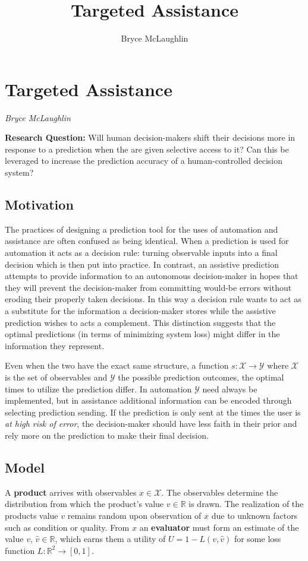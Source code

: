 \documentclass[10pt]{article}
\title{Targeted Assistance}
\author{Bryce McLaughlin}
\newcommand{\X}{\mathcal{X}}
\newcommand{\Y}{\mathcal{Y}}
\begin{document}
\section*{Targeted Assistance}

\textit{Bryce McLaughlin}

\medskip

\textbf{Research Question:} Will human decision-makers shift their decisions more in response to a prediction when the are given selective access to it? Can this be leveraged to increase the prediction accuracy of a human-controlled decision system?

\subsection*{Motivation}
The practices of designing a prediction tool for the uses of automation and assistance are often confused as being identical. When a prediction is used for automation it acts as a decision rule: turning observable inputs into a final decision which is then put into practice. In contrast, an assistive prediction attempts to provide information to an autonomous decision-maker in hopes that they will prevent the decision-maker from committing would-be errors without eroding their properly taken decisions. In this way a decision rule wants to act as a substitute for the information a decision-maker stores while the assistive prediction wishes to acts a complement. This distinction suggests that the optimal predictions (in terms of minimizing system loss) might differ in the information they represent.

Even when the two have the exact same structure, a function $s: \X \to \Y$ where $\X$ is the set of observables and $\Y$ the possible prediction outcomes, the optimal times to utilize the prediction differ. In automation $\Y$ need always be implemented, but in assistance additional information can be encoded through selecting prediction sending. If the prediction is only sent at the times the user is \textit{at high risk of error}, the decision-maker should have less faith in their prior and rely more on the prediction to make their final decision.     

\subsection*{Model}

A \textbf{product} arrives with observables $x \in \X$. The observables determine the distribution from which the product's value $v \in \mathbb{R}$ is drawn. The  realization of the products value $v$ remains random upon observation of $x$ due to unknown factors such as condition or quality. From $x$ an \textbf{evaluator} must form an estimate of the value $v$, $\hat{v} \in \mathbb{R}$, which earns them a utility of $U = 1 - L(v,\hat{v})$ for some loss function $L: \mathbb{R}^2 \to [0,1]$.
\end{document}
